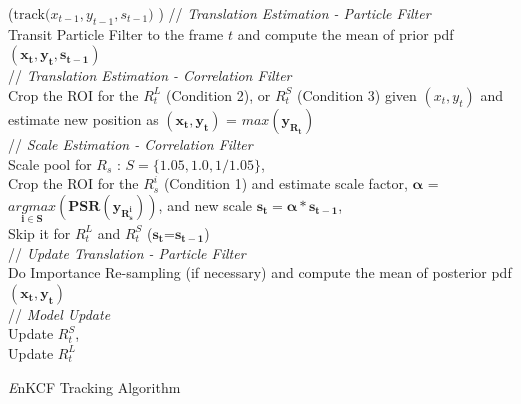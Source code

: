 \documentclass[10pt,twocolumn,letterpaper]{article}
\begin{document}
\begin{algorithm*}[h]
\small
\DontPrintSemicolon
{}
\Begin($\text{track($x_{t-1},y_{t-1},s_{t-1}$) }$)
{
 	// \textit{Translation Estimation - Particle Filter} \\
	Transit Particle Filter to the frame $t$ and compute the mean of prior pdf $\mathbf{(x_{t},y_{t},s_{t-1})}$ \\
     // \textit{Translation Estimation - Correlation Filter} \\
	Crop the ROI for the $R_{t}^{L}$ (Condition 2), or $R_{t}^{S}$ (Condition 3) given $(x_{t},y_{t})$ and estimate new position as $\mathbf{(x_{t},y_{t})}$ = $\mathbf{\textit{max}(y_{R_{t}})}$\\
	// \textit{Scale Estimation - Correlation Filter}\\
	Scale pool for $R_{s}$ : $S = \lbrace1.05,1.0,1/1.05\rbrace$,\\
	Crop the ROI for the $R_{s}^{i}$ (Condition 1) and estimate scale factor, $\mathbf{\alpha}$ = $\mathbf{\underset{i\in S}{\textit{argmax}}(PSR(y_{R_{s}^{i}}))}$, and new scale $\mathbf{s_{t} = \alpha * s_{t-1}}$,\\ 
	Skip it for $R_{t}^{L}$ and $R_{t}^{S}$ ($\mathbf{s_{t}}$=$\mathbf{s_{t-1}}$)\\
	// \textit{Update Translation - Particle Filter}\\
	Do Importance Re-sampling (if necessary) and compute the 
	mean of posterior pdf $\mathbf{(x_{t},y_{t})}$\\
	// \textit{Model Update}\\
	Update $R_{t}^{S}$,\\
	Update $R_{t}^{L}$\\
  \label{endfor}
}
\caption{{\it E}nKCF Tracking Algorithm}\label{alg:MKCF}
\end{algorithm*}
\end{document}
